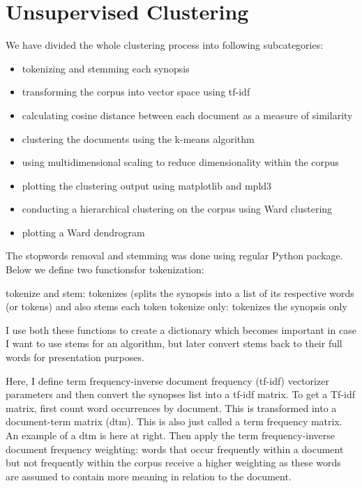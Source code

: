 \documentclass[]{article}
\begin{document}
\section{Unsupervised Clustering}

We have divided the whole clustering process into following subcategories:

\begin{itemize}
    \item tokenizing and stemming each synopsis
\item transforming the corpus into vector space using tf-idf
\item calculating cosine distance between each document as a measure of similarity
\item clustering the documents using the k-means algorithm

\item using multidimensional scaling to reduce dimensionality within the corpus
\item plotting the clustering output using matplotlib and mpld3
\item conducting a hierarchical clustering on the corpus using Ward clustering
\item plotting a Ward dendrogram
\end{itemize}



The stopwords removal and stemming was done using regular Python package. Below we define two functionsfor tokenization:

tokenize and stem: tokenizes (splits the synopsis into a list of its respective words (or tokens) and also stems each token
tokenize only: tokenizes the synopsis only


I use both these functions to create a dictionary which becomes important in case I want to use stems for an algorithm, but later convert stems back to their full words for presentation purposes.

Here, I define term frequency-inverse document frequency (tf-idf) vectorizer parameters and then convert the synopses list into a tf-idf matrix. To get a Tf-idf matrix, first count word occurrences by document. This is transformed into a document-term matrix (dtm). This is also just called a term frequency matrix. An example of a dtm is here at right. Then apply the term frequency-inverse document frequency weighting: words that occur frequently within a document but not frequently within the corpus receive a higher weighting as these words are assumed to contain more meaning in relation to the document.
\end{document}
